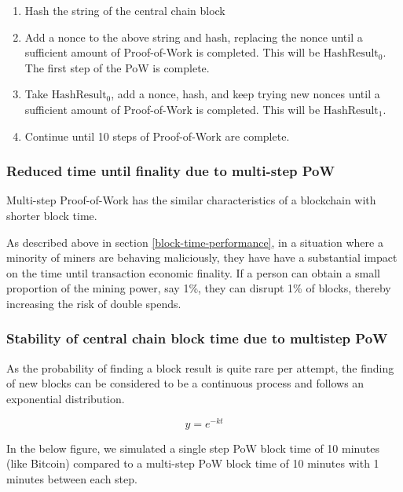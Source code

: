 \documentclass[a4paper,12pt]{article}
\begin{document}
\begin{enumerate}
  \item Hash the string of the central chain block
  \item Add a nonce to the above string and hash, replacing the nonce until a sufficient amount of Proof-of-Work is completed. This will be $\text{HashResult}_0$. The first step of the PoW is complete. 
  \item Take $\text{HashResult}_0$, add a nonce, hash, and keep trying new nonces until  a sufficient amount of Proof-of-Work is completed. This will be $\text{HashResult}_1$.
  \item Continue until 10 steps of Proof-of-Work are complete. 
\end{enumerate}

\subsubsection{Reduced time until finality due to multi-step PoW}
Multi-step Proof-of-Work has the similar characteristics of a blockchain with shorter block time. 

As described above in section \ref{block-time-performance}, in a situation where a minority of miners are behaving maliciously, they have have a substantial impact on the time until transaction economic finality. If a person can obtain a small proportion of the mining power, say 1\%, they can disrupt 1\% of blocks, thereby increasing the risk of double spends. 


\subsubsection{Stability of central chain block time due to multistep PoW}

As the probability of finding a block result is quite rare per attempt, the finding of new blocks can be considered to be a continuous process and follows an exponential distribution.

\[ y=e^{-kt}\]


In the below figure, we simulated a single step PoW block time of 10 minutes (like Bitcoin) compared to a multi-step PoW block time of 10 minutes with 1 minutes between each step. 
\end{document}
